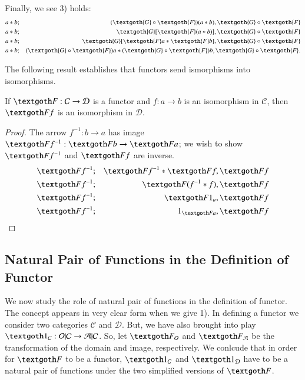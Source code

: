 \documentclass [12pt]{book}
\begin{document}
Finally, we see 3) holds:
\begin{eqnarray}\nonumber a*b&;&(\textgoth{G}\circ\textgoth{F})(a*b),\textgoth{G}\circ\textgoth{F}\\\nonumber a*b&;&\textgoth{G}[\textgoth{F}(a*b)],\textgoth{G}\circ\textgoth{F}\\\nonumber a*b&;&\textgoth{G}[\textgoth{F}a*\textgoth{F}b],\textgoth{G}\circ\textgoth{F}\\\nonumber a*b&;&(\textgoth{G}\circ\textgoth{F})a*(\textgoth{G}\circ\textgoth{F})b,\textgoth{G}\circ\textgoth{F}.\end{eqnarray}

The following result establishes that functors send ismorphisms into isomorphisms. 

\begin{proposition}If $\textgoth F:\mathcal C\rightarrow\mathcal D$ is a functor and $f:a\rightarrow b$ is an isomorphism in $\mathcal C$, then $\textgoth Ff$ is an isomorphism in $\mathcal D$.\label{iso map}\end{proposition}

\begin{proof}The arrow $f^{-1}:b\rightarrow a$ has image $\textgoth Ff^{-1}:\textgoth Fb\rightarrow\textgoth Fa$; we wish to show $\textgoth Ff^{-1}$ and $\textgoth Ff$ are inverse.\begin{eqnarray}\nonumber\textgoth Ff^{-1}&;&\textgoth Ff^{-1}*\textgoth Ff,\textgoth Ff\\\nonumber\textgoth Ff^{-1}&;&\textgoth F(f^{-1}*f),\textgoth Ff\\\nonumber\textgoth Ff^{-1}&;&\textgoth F1_a,\textgoth Ff\\\nonumber\textgoth Ff^{-1}&;&1_{\textgoth Fa},\textgoth Ff\end{eqnarray}\end{proof}

\subsection{Natural Pair of Functions in the Definition of Functor}

We now study the role of natural pair of functions in the definition of functor. The concept appears in very clear form when we give 1). In defining a functor we consider two categories $\mathcal C$ and $\mathcal D$. But, we have also brought into play $\textgoth1_\mathcal C:\mathcal{O|C}\rightarrow\mathcal{A|C}$. So, let $\textgoth F_\mathcal O$ and $\textgoth F_\mathcal A$ be the transformation of the domain and image, respectively. We conlcude that in order for $\textgoth F$ to be a functor, $\textgoth1_\mathcal C$ and $\textgoth1_\mathcal D$ have to be a natural pair of functions under the two simplified versions of $\textgoth F$.
\end{document}
